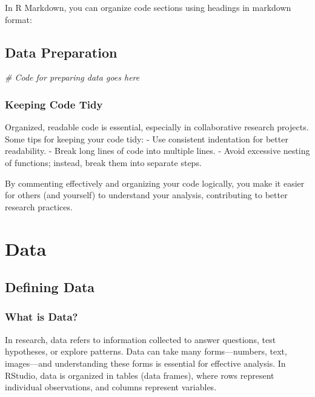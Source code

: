 \documentclass[
]{book}
\newenvironment{Shaded}{\begin{snugshade}}{\end{snugshade}}
\newcommand{\CommentTok}[1]{\textcolor[rgb]{0.56,0.35,0.01}{\textit{#1}}}
\begin{document}
In R Markdown, you can organize code sections using headings in markdown format:

\section{Data Preparation}\label{data-preparation}

\begin{Shaded}
\begin{Highlighting}[]
\CommentTok{\# Code for preparing data goes here}
\end{Highlighting}
\end{Shaded}

\subsection*{Keeping Code Tidy}\label{keeping-code-tidy}

Organized, readable code is essential, especially in collaborative research projects. Some tips for keeping your code tidy:
- Use consistent indentation for better readability.
- Break long lines of code into multiple lines.
- Avoid excessive nesting of functions; instead, break them into separate steps.

By commenting effectively and organizing your code logically, you make it easier for others (and yourself) to understand your analysis, contributing to better research practices.

\chapter{Data}\label{data}

\section{Defining Data}\label{defining-data}

\subsection*{What is Data?}\label{what-is-data}

In research, data refers to information collected to answer questions, test hypotheses, or explore patterns. Data can take many forms---numbers, text, images---and understanding these forms is essential for effective analysis. In RStudio, data is organized in tables (data frames), where rows represent individual observations, and columns represent variables.
\end{document}

